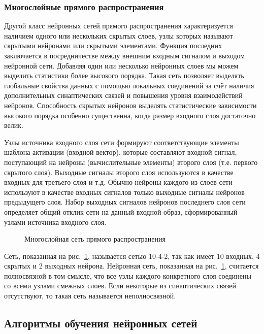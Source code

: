 \subsubsection{Многослойные прямого распространения}

Другой класс нейронных сетей прямого распространения характеризуется наличием одного или нескольких скрытых слоев, узлы которых называют скрытыми нейронами или скрытыми элементами.
Функция последних заключается в посредничестве между внешним входным сигналом и выходом нейронной сети.
Добавляя один или несколько нейронных слоев мы можем выделить статистики более высокого порядка.
Такая сеть позволяет выделять глобальные свойства данных с помощью локальных соединений за счёт наличия дополнительных синаптических связей и повышения уровня взаимодействий нейронов.
Способность скрытых нейронов выделять статистические зависимости высокого порядка особенно существенна, когда размер входного слоя достаточно велик.

Узлы источника входного слоя сети формируют соответствующие элементы шаблона активации (входной вектор), которые составляют входной сигнал, поступающий на нейроны (вычислительные элементы) второго слоя (т.е. первого скрытого слоя).
Выходные сигналы второго слоя используются в качестве входных для третьего слоя и т.д.
Обычно нейроны каждого из слоев сети используют в качестве входных сигналов только выходные сигналы нейронов предыдущего слоя.
Набор выходных сигналов нейронов последнего слоя сети определяет общий отклик сети на данный входной образ, сформированный узлами источника входного слоя.

\begin{figure}[ht]
\caption{Многослойная сеть прямого распространения}
\label{ris:ManyLayer}
\end{figure}

Сеть, показанная на рис.~\ref{ris:ManyLayer}, называется сетью 10-4-2, так как имеет 10 входных, 4 скрытых и 2 выходных нейрона.
Нейронная сеть, показанная на рис.~\ref{ris:ManyLayer}, считается полносвязной в том смысле, что все узлы каждого конкретного слоя соединены со всеми узлами смежных слоев.
Если некоторые из синаптических связей отсутствуют, то такая сеть называется неполносвязной.\cite{NejronnyeSeti}

\subsection{Алгоритмы обучения нейронных сетей}

